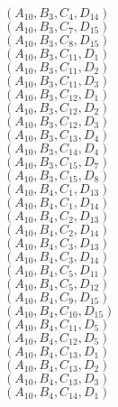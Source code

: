 \documentclass[14pt]{article}
\begin{document}
    $({A}_{10}, {B}_{3}, {C}_{4}, {D}_{14}) $ \\ 
    $({A}_{10}, {B}_{3}, {C}_{7}, {D}_{15}) $ \\ 
    $({A}_{10}, {B}_{3}, {C}_{8}, {D}_{15}) $ \\ 
    $({A}_{10}, {B}_{3}, {C}_{11}, {D}_{1}) $ \\ 
    $({A}_{10}, {B}_{3}, {C}_{11}, {D}_{2}) $ \\ 
    $({A}_{10}, {B}_{3}, {C}_{11}, {D}_{3}) $ \\ 
    $({A}_{10}, {B}_{3}, {C}_{12}, {D}_{1}) $ \\ 
    $({A}_{10}, {B}_{3}, {C}_{12}, {D}_{2}) $ \\ 
    $({A}_{10}, {B}_{3}, {C}_{12}, {D}_{3}) $ \\ 
    $({A}_{10}, {B}_{3}, {C}_{13}, {D}_{4}) $ \\ 
    $({A}_{10}, {B}_{3}, {C}_{14}, {D}_{4}) $ \\ 
    $({A}_{10}, {B}_{3}, {C}_{15}, {D}_{7}) $ \\ 
    $({A}_{10}, {B}_{3}, {C}_{15}, {D}_{8}) $ \\ 
    $({A}_{10}, {B}_{4}, {C}_{1}, {D}_{13}) $ \\ 
    $({A}_{10}, {B}_{4}, {C}_{1}, {D}_{14}) $ \\ 
    $({A}_{10}, {B}_{4}, {C}_{2}, {D}_{13}) $ \\ 
    $({A}_{10}, {B}_{4}, {C}_{2}, {D}_{14}) $ \\ 
    $({A}_{10}, {B}_{4}, {C}_{3}, {D}_{13}) $ \\ 
    $({A}_{10}, {B}_{4}, {C}_{3}, {D}_{14}) $ \\ 
    $({A}_{10}, {B}_{4}, {C}_{5}, {D}_{11}) $ \\ 
    $({A}_{10}, {B}_{4}, {C}_{5}, {D}_{12}) $ \\ 
    $({A}_{10}, {B}_{4}, {C}_{9}, {D}_{15}) $ \\ 
    $({A}_{10}, {B}_{4}, {C}_{10}, {D}_{15}) $ \\ 
    $({A}_{10}, {B}_{4}, {C}_{11}, {D}_{5}) $ \\ 
    $({A}_{10}, {B}_{4}, {C}_{12}, {D}_{5}) $ \\ 
    $({A}_{10}, {B}_{4}, {C}_{13}, {D}_{1}) $ \\ 
    $({A}_{10}, {B}_{4}, {C}_{13}, {D}_{2}) $ \\ 
    $({A}_{10}, {B}_{4}, {C}_{13}, {D}_{3}) $ \\ 
    $({A}_{10}, {B}_{4}, {C}_{14}, {D}_{1}) $ \\ 
\end{document}
